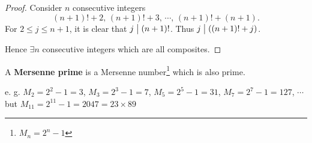 \begin{proof}
    Consider $n$ consecutive integers
    \[
        \left(n+1\right)!+2,\,\left(n+1\right)!+3,\,\cdots,\,\left(n+1\right)!+\left(n+1\right).
    \]
    For $2\leq j \leq n+1$, it is clear that $j \bigm| \left(n+1\right)!$.
    Thus $j \bigm| \left(\left(n+1\right)!+j\right)$.

    Hence $\exists n$ consecutive integers which are all composites.
\end{proof}

\begin{definition}
    A \textbf{Mersenne prime} is a Mersenne number\footnote{$M_n = 2^n - 1$}
    which is also prime.
\end{definition}

e. g. $M_2 = 2^2-1 = 3$, $M_3 = 2^3-1 = 7$, $M_5 = 2^5-1 = 31$,
$M_7 = 2^7-1 = 127$, $\cdots$ but $M_{11} = 2^{11}-1 = 2047 = 23 \times 89$


